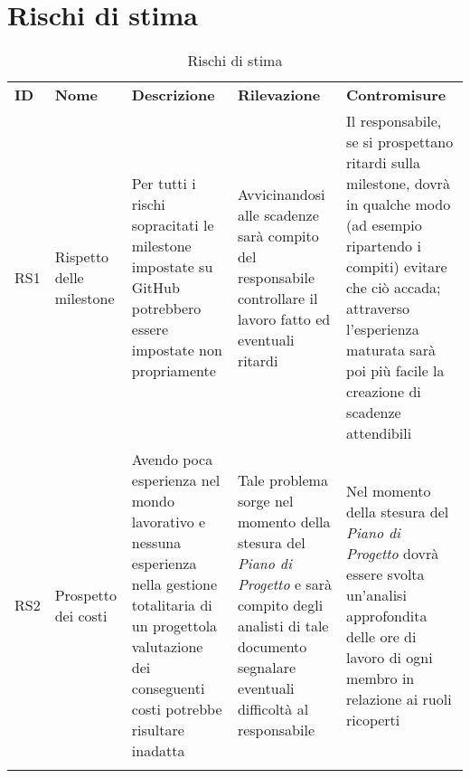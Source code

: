 \section{Rischi di stima}
	\begin{longtable} {
		>{}p{10mm} 
		>{}p{24mm}
		>{}p{32mm} 
		>{}p{32mm}
		>{}p{32mm}
		}
	\rowcolor{gray!50}
		\textbf{ID} & \textbf{Nome} & \textbf{Descrizione} & \textbf{Rilevazione} & \textbf{Contromisure} 	\TBstrut \\
		RS1 & Rispetto delle milestone & Per tutti i rischi sopracitati le milestone impostate su GitHub potrebbero essere impostate non propriamente & Avvicinandosi alle scadenze sarà compito del responsabile controllare il lavoro fatto ed eventuali ritardi & Il responsabile, se si prospettano ritardi sulla milestone, dovrà in qualche modo (ad esempio ripartendo i compiti) evitare che ciò accada; attraverso l'esperienza maturata sarà poi più facile la creazione di scadenze attendibili \TBstrut \\ [2mm]
		RS2 & Prospetto dei costi & Avendo poca esperienza nel mondo lavorativo e nessuna esperienza nella gestione totalitaria di un progetto\glosp la valutazione dei conseguenti costi potrebbe risultare inadatta & Tale problema sorge nel momento della stesura del \textit{Piano di Progetto} e sarà compito degli analisti di tale documento segnalare eventuali difficoltà al responsabile & Nel momento della stesura del \textit{Piano di Progetto} dovrà essere svolta un'analisi approfondita delle ore di lavoro di ogni membro in relazione ai ruoli ricoperti \TBstrut \\ [2mm]
		\rowcolor{white}
		\caption{Rischi di stima}
	\end{longtable}
